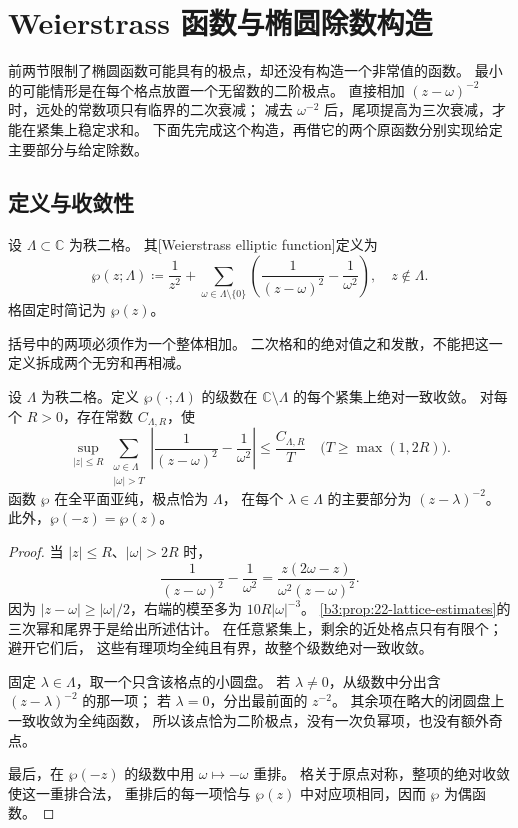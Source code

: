 \section{Weierstrass 函数与椭圆除数构造}
\label{b3:sec:2203}

前两节限制了椭圆函数可能具有的极点，却还没有构造一个非常值的函数。
最小的可能情形是在每个格点放置一个无留数的二阶极点。
直接相加 \((z-\omega)^{-2}\) 时，远处的常数项只有临界的二次衰减；
减去 \(\omega^{-2}\) 后，尾项提高为三次衰减，才能在紧集上稳定求和。
下面先完成这个构造，再借它的两个原函数分别实现给定主要部分与给定除数。

\subsection{定义与收敛性}
\label{b3:subsec:220301}

\begin{definition}\label{b3:def:22-wp}
设 \(\Lambda\subset\mathbb C\) 为秩二格。
其[Weierstrass elliptic function]定义为
\[
 \wp(z;\Lambda)\coloneqq\frac1{z^2}
   +\sum_{\omega\in\Lambda\setminus\{0\}}
      \left(\frac1{(z-\omega)^2}-\frac1{\omega^2}\right),
 \quad z\notin\Lambda.
\]
格固定时简记为 \(\wp(z)\)。
\end{definition}

括号中的两项必须作为一个整体相加。
二次格和的绝对值之和发散，不能把这一定义拆成两个无穷和再相减。

\begin{proposition}[正规收敛与局部极点]\label{b3:prop:22-wp-convergence}
设 \(\Lambda\) 为秩二格。定义 \(\wp(\cdot;\Lambda)\) 的级数在
\(\mathbb C\setminus\Lambda\) 的每个紧集上绝对一致收敛。
对每个 \(R>0\)，存在常数 \(C_{\Lambda,R}\)，使
\[
 \sup_{|z|\le R}
 \sum_{\substack{\omega\in\Lambda\\|\omega|>T}}
 \left|\frac1{(z-\omega)^2}-\frac1{\omega^2}\right|
 \le\frac{C_{\Lambda,R}}T
 \quad\bigl(T\ge\max(1,2R)\bigr).
\]
函数 \(\wp\) 在全平面亚纯，极点恰为 \(\Lambda\)，
在每个 \(\lambda\in\Lambda\) 的主要部分为 \((z-\lambda)^{-2}\)。
此外，\(\wp(-z)=\wp(z)\)。
\end{proposition}
\begin{proof}
当 \(|z|\le R\)、\(|\omega|>2R\) 时，
\[
 \frac1{(z-\omega)^2}-\frac1{\omega^2}
 =\frac{z(2\omega-z)}{\omega^2(z-\omega)^2}.
\]
因为 \(|z-\omega|\ge|\omega|/2\)，右端的模至多为
\(10R|\omega|^{-3}\)。
\cref{b3:prop:22-lattice-estimates}的三次幂和尾界于是给出所述估计。
在任意紧集上，剩余的近处格点只有有限个；避开它们后，
这些有理项均全纯且有界，故整个级数绝对一致收敛。

固定 \(\lambda\in\Lambda\)，取一个只含该格点的小圆盘。
若 \(\lambda\ne0\)，从级数中分出含 \((z-\lambda)^{-2}\) 的那一项；
若 \(\lambda=0\)，分出最前面的 \(z^{-2}\)。
其余项在略大的闭圆盘上一致收敛为全纯函数，
所以该点恰为二阶极点，没有一次负幂项，也没有额外奇点。

最后，在 \(\wp(-z)\) 的级数中用 \(\omega\mapsto-\omega\) 重排。
格关于原点对称，整项的绝对收敛使这一重排合法，
重排后的每一项恰与 \(\wp(z)\) 中对应项相同，因而 \(\wp\) 为偶函数。
\end{proof}

